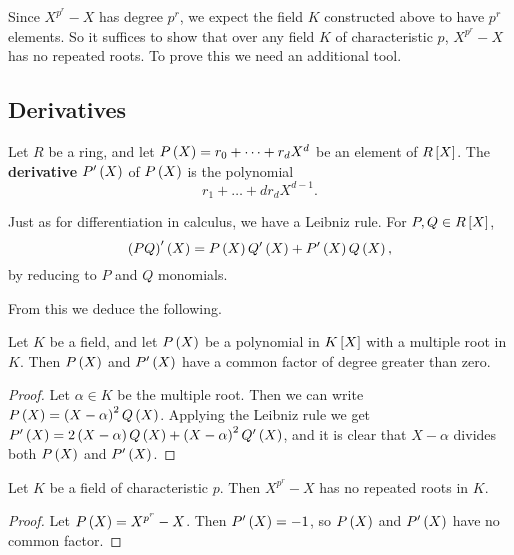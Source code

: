 Since $ X^{p^r} - X $ has degree $ p^r $, we expect the field $ K $ constructed above to have $ p^r $ elements. So it suffices to show that over any field $ K $ of characteristic $ p $, $ X^{p^r} - X $ has no repeated roots. To prove this we need an additional tool.

\pagebreak

\subsection{Derivatives}

\begin{definition}
Let $ R $ be a ring, and let $ P\br{X} = r_0 + \dots + r_dX^d $ be an element of $ R\sbr{X} $. The \textbf{derivative} $ P'\br{X} $ of $ P\br{X} $ is the polynomial
$$ r_1 + \dots + dr_dX^{d - 1}. $$
\end{definition}

\begin{note*}
Just as for differentiation in calculus, we have a Leibniz rule. For $ P, Q \in R\sbr{X} $,
$$ \br{PQ}'\br{X} = P\br{X}Q'\br{X} + P'\br{X}Q\br{X}, $$
by reducing to $ P $ and $ Q $ monomials.
\end{note*}

From this we deduce the following.

\begin{lemma}
Let $ K $ be a field, and let $ P\br{X} $ be a polynomial in $ K\sbr{X} $ with a multiple root in $ K $. Then $ P\br{X} $ and $ P'\br{X} $ have a common factor of degree greater than zero.
\end{lemma}

\begin{proof}
Let $ \alpha \in K $ be the multiple root. Then we can write $ P\br{X} = \br{X - \alpha}^2Q\br{X} $. Applying the Leibniz rule we get $ P'\br{X} = 2\br{X - \alpha}Q\br{X} + \br{X - \alpha}^2Q'\br{X} $, and it is clear that $ X - \alpha $ divides both $ P\br{X} $ and $ P'\br{X} $.
\end{proof}

\begin{corollary}
Let $ K $ be a field of characteristic $ p $. Then $ X^{p^r} - X $ has no repeated roots in $ K $.
\end{corollary}

\begin{proof}
Let $ P\br{X} = X^{p^r} - X $. Then $ P'\br{X} = -1 $, so $ P\br{X} $ and $ P'\br{X} $ have no common factor.
\end{proof}

